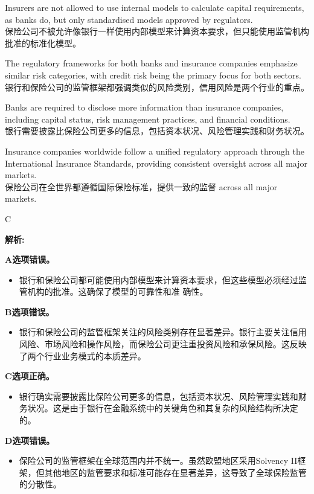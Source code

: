 \documentclass{article}
\newenvironment{explanation}
{\textbf{解析:}\par}
{\par}
\begin{document}
\begin{choices}
    \item Insurers are not allowed to use internal models to calculate capital requirements, as banks do, but only standardised models approved by regulators.\\
    保险公司不被允许像银行一样使用内部模型来计算资本要求，但只能使用监管机构批准的标准化模型。
    \item The regulatory frameworks for both banks and insurance companies emphasize similar risk categories, with credit risk being the primary focus for both sectors.\\
    银行和保险公司的监管框架都强调类似的风险类别，信用风险是两个行业的重点。
    \item Banks are required to disclose more information than insurance companies, including capital status, risk management practices, and financial conditions.\\
    银行需要披露比保险公司更多的信息，包括资本状况、风险管理实践和财务状况。
    \item Insurance companies worldwide follow a unified regulatory approach through the International Insurance Standards, providing consistent oversight across all major markets.\\
    保险公司在全世界都遵循国际保险标准，提供一致的监督 across all major markets.
\end{choices}

\begin{correctanswer}
    C
\end{correctanswer}

\begin{explanation}
    \textbf{A选项错误。}
    \begin{itemize}
        \item 银行和保险公司都可能使用内部模型来计算资本要求，但这些模型必须经过监管机构的批准。这确保了模型的可靠性和准
        确性。
    \end{itemize}

    \textbf{B选项错误。}
    \begin{itemize}
        \item 银行和保险公司的监管框架关注的风险类别存在显著差异。银行主要关注信用风险、市场风险和操作风险，而保险公司更注重投资风险和承保风险。这反映了两个行业业务模式的本质差异。
    \end{itemize}

    \textbf{C选项正确。}
    \begin{itemize}
        \item 银行确实需要披露比保险公司更多的信息，包括资本状况、风险管理实践和财务状况。这是由于银行在金融系统中的关键角色和其复杂的风险结构所决定的。
    \end{itemize}

    \textbf{D选项错误。}
    \begin{itemize}
        \item 保险公司的监管框架在全球范围内并不统一。虽然欧盟地区采用Solvency II框架，但其他地区的监管要求和标准可能存在显著差异，这导致了全球保险监管的分散性。
    \end{itemize}
\end{explanation}
\end{document}
